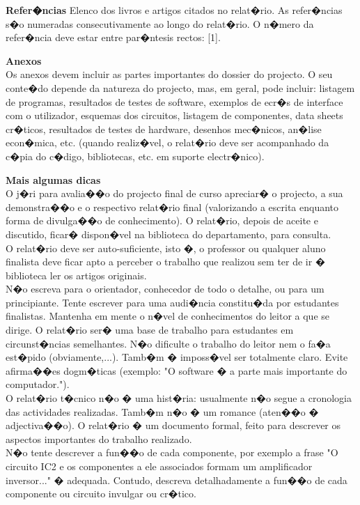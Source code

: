\textbf{Refer�ncias}
Elenco dos livros e artigos citados no relat�rio. As refer�ncias s�o numeradas consecutivamente ao longo do relat�rio. O n�mero da refer�ncia deve estar entre par�ntesis rectos: [1].

\textbf{Anexos}\\
Os anexos devem incluir as partes importantes do dossier do projecto. O seu conte�do depende da natureza do projecto, mas, em geral, pode incluir: listagem de programas, resultados de testes de software, exemplos de ecr�s de interface com o utilizador, esquemas dos circuitos, listagem de componentes, data sheets cr�ticos, resultados de testes de hardware, desenhos mec�nicos, an�lise econ�mica, etc. (quando realiz�vel, o relat�rio deve ser acompanhado da c�pia do c�digo, bibliotecas, etc. em suporte electr�nico).

\textbf{Mais algumas dicas}\\
O j�ri para avalia��o do projecto final de curso apreciar� o projecto, a sua demonstra��o e o respectivo relat�rio final (valorizando a escrita enquanto forma de divulga��o de conhecimento). O relat�rio, depois de aceite e discutido, ficar� dispon�vel na biblioteca do departamento, para consulta.\\

O relat�rio deve ser auto-suficiente, isto �, o professor ou qualquer aluno finalista deve ficar apto a perceber o trabalho que realizou sem ter de ir � biblioteca ler os artigos originais.\\

N�o escreva para o orientador, conhecedor de todo o detalhe, ou para um principiante. Tente escrever para uma audi�ncia constitu�da por estudantes finalistas. Mantenha em mente o n�vel de conhecimentos do leitor a que se dirige. O relat�rio ser� uma base de trabalho para estudantes em circunst�ncias semelhantes. N�o dificulte o trabalho do leitor nem o fa�a est�pido (obviamente,...). Tamb�m � imposs�vel ser totalmente claro. Evite afirma��es dogm�ticas (exemplo: "O software � a parte mais importante do computador.").\\

O relat�rio t�cnico n�o � uma hist�ria: usualmente n�o segue a cronologia das actividades realizadas. Tamb�m n�o � um romance (aten��o � adjectiva��o). O relat�rio � um documento formal, feito para descrever os aspectos importantes do trabalho realizado.\\

N�o tente descrever a fun��o de cada componente, por exemplo a frase "O circuito IC2 e os componentes a ele associados formam um amplificador inversor..." � adequada. Contudo, descreva detalhadamente a fun��o de cada componente ou circuito invulgar ou cr�tico.\\

